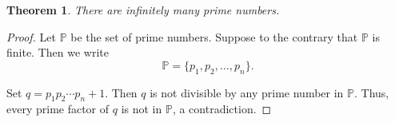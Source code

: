 \documentclass{article}
\theoremstyle{plain}
\newtheorem{theorem}{Theorem}
\begin{document}
\begin{theorem}
There are infinitely many prime numbers.
\end{theorem}
\begin{proof}
Let $\mathbb{P}$ be the set of prime numbers. 
Suppose to the contrary that $\mathbb{P}$ is finite.
Then we write
\[
\mathbb{P}=\{p_1, p_2, \ldots, p_n\}.
\]

Set $q=p_1p_2 \cdots p_n+1$. 
Then $q$ is not divisible by any prime number in $\mathbb{P}$.
Thus, every prime factor of $q$ is not in $\mathbb{P}$, a contradiction.

\end{proof}
\end{document}
